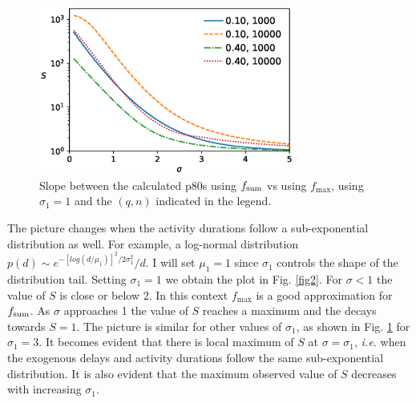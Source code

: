 \documentclass[reprint,aps,prl,amsmath,amssymb,superscriptaddress,showpacs]{revtex4-1}
\begin{document}
\begin{figure}[t]
\includegraphics[width=3.3in]{maxsum.scheduling.dupsplit.arc_distribution_lognormal.arc_sigma_3.eps}
\caption{Slope between the calculated p80s using $f_{\rm sum}$ vs using $f_{\max}$, using $\sigma_1=1$ and the $(q,n)$ indicated in the legend. }
\label{fig3}
\end{figure}

The picture changes when the activity durations follow a sub-exponential distribution as well. For example, a log-normal distribution $p(d)\sim e^{-[log(d/\mu_1)]^2/2\sigma_1^2}/d$. I will set $\mu_1=1$ since $\sigma_1$ controls the shape of the distribution tail. Setting $\sigma_1=1$ we obtain the plot in Fig. \ref{fig2}. For $\sigma<1$ the value of $S$ is close or below 2. In this context $f_{\max}$ is a good approximation for $f_{\rm sum}$. As $\sigma$ approaches 1 the value of $S$ reaches a maximum and the decays towards $S=1$. The picture is similar for other values of $\sigma_1$, as shown in Fig. \ref{fig3} for $\sigma_1=3$. It becomes evident that there is local maximum of $S$ at $\sigma=\sigma_1$, {\em i.e.} when the exogenous delays and activity durations follow the same sub-exponential distribution. It is also evident that the maximum observed value of $S$ decreases with increasing $\sigma_1$. 
\end{document}
